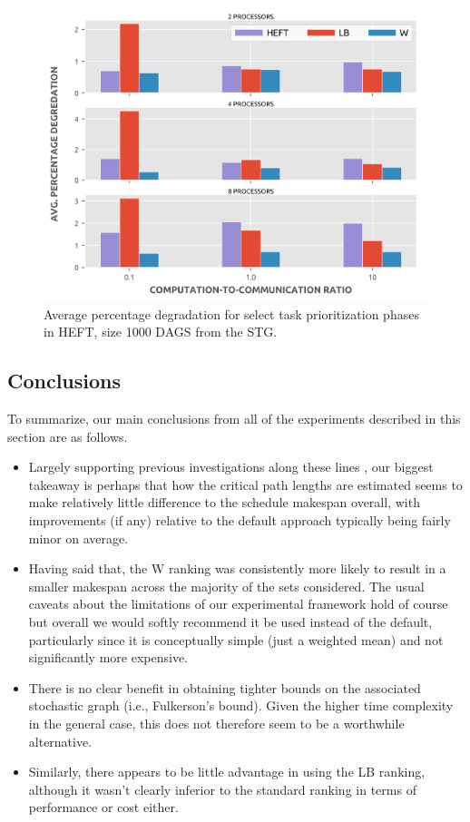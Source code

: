 \documentclass[12pt]{article}
\begin{document}
\begin{figure}
	\centering	
	\includegraphics[scale=0.8]{1000tasks_apd.png}
	\caption{Average percentage degradation for select task prioritization phases in HEFT, size 1000 DAGS from the STG.}	
	\label{plot.rankings_apd_1000}
\end{figure}

\subsection{Conclusions}
\label{subsect.conclusions}

To summarize, our main conclusions from all of the experiments described in this section are as follows.
\begin{itemize}
	\item Largely supporting previous investigations along these lines \cite{zhao03}, our biggest takeaway is perhaps that how the critical path lengths are estimated seems to make relatively little difference to the schedule makespan overall, with improvements (if any) relative to the default approach typically being fairly minor on average.
	\item Having said that, the W ranking was consistently more likely to result in a smaller makespan across the majority of the sets considered. The usual caveats about the limitations of our experimental framework hold of course but overall we would softly recommend it be used instead of the default, particularly since it is conceptually simple (just a weighted mean) and not significantly more expensive.
	\item There is no clear benefit in obtaining tighter bounds on the associated stochastic graph (i.e., Fulkerson's bound). Given the higher time complexity in the general case, this does not therefore seem to be a worthwhile alternative.    
	\item Similarly, there appears to be little advantage in using the LB ranking, although it wasn't clearly inferior to the standard ranking in terms of performance or cost either.  
\end{itemize} 
\end{document}
